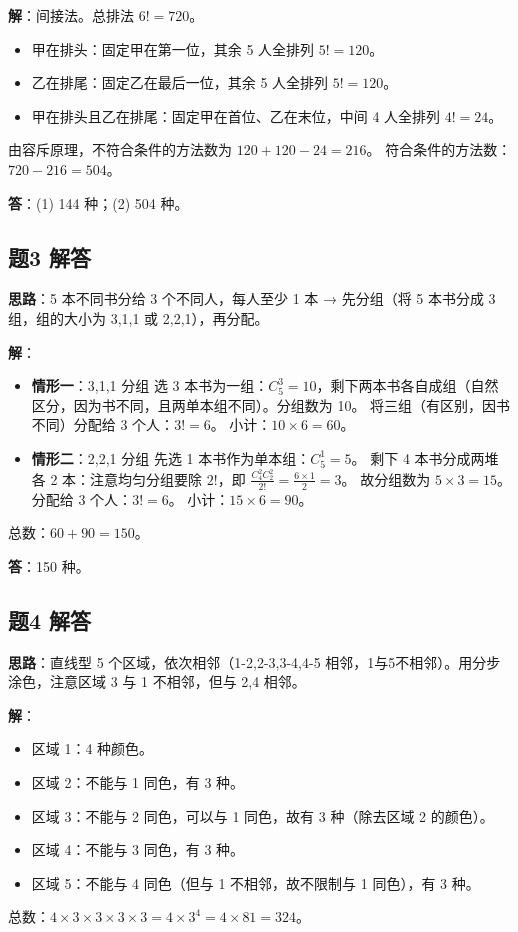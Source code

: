 \documentclass[10pt]{article}
\begin{document}
\textbf{解}：间接法。总排法 \(6! = 720\)。
\begin{itemize}
\item 甲在排头：固定甲在第一位，其余 5 人全排列 \(5! = 120\)。
\item 乙在排尾：固定乙在最后一位，其余 5 人全排列 \(5! = 120\)。
\item 甲在排头且乙在排尾：固定甲在首位、乙在末位，中间 4 人全排列 \(4! = 24\)。
\end{itemize}
由容斥原理，不符合条件的方法数为 \(120 + 120 - 24 = 216\)。
符合条件的方法数：\(720 - 216 = 504\)。

\textbf{答}：(1) 144 种；(2) 504 种。

\subsection*{题3 解答}
\textbf{思路}：5 本不同书分给 3 个不同人，每人至少 1 本 → 先分组（将 5 本书分成 3 组，组的大小为 3,1,1 或 2,2,1），再分配。

\textbf{解}：
\begin{itemize}
\item \textbf{情形一}：3,1,1 分组
  选 3 本书为一组：\(C_5^3 = 10\)，剩下两本书各自成组（自然区分，因为书不同，且两单本组不同）。分组数为 10。
  将三组（有区别，因书不同）分配给 3 个人：\(3! = 6\)。
  小计：\(10 \times 6 = 60\)。
\item \textbf{情形二}：2,2,1 分组
  先选 1 本书作为单本组：\(C_5^1 = 5\)。
  剩下 4 本书分成两堆各 2 本：注意均匀分组要除 \(2!\)，即 \(\frac{C_4^2 C_2^2}{2!} = \frac{6 \times 1}{2} = 3\)。
  故分组数为 \(5 \times 3 = 15\)。
  分配给 3 个人：\(3! = 6\)。
  小计：\(15 \times 6 = 90\)。
\end{itemize}
总数：\(60 + 90 = 150\)。

\textbf{答}：150 种。

\subsection*{题4 解答}
\textbf{思路}：直线型 5 个区域，依次相邻（1-2,2-3,3-4,4-5 相邻，1与5不相邻）。用分步涂色，注意区域 3 与 1 不相邻，但与 2,4 相邻。

\textbf{解}：
\begin{itemize}
\item 区域 1：4 种颜色。
\item 区域 2：不能与 1 同色，有 3 种。
\item 区域 3：不能与 2 同色，可以与 1 同色，故有 3 种（除去区域 2 的颜色）。
\item 区域 4：不能与 3 同色，有 3 种。
\item 区域 5：不能与 4 同色（但与 1 不相邻，故不限制与 1 同色），有 3 种。
\end{itemize}
总数：\(4 \times 3 \times 3 \times 3 \times 3 = 4 \times 3^4 = 4 \times 81 = 324\)。
\end{document}
